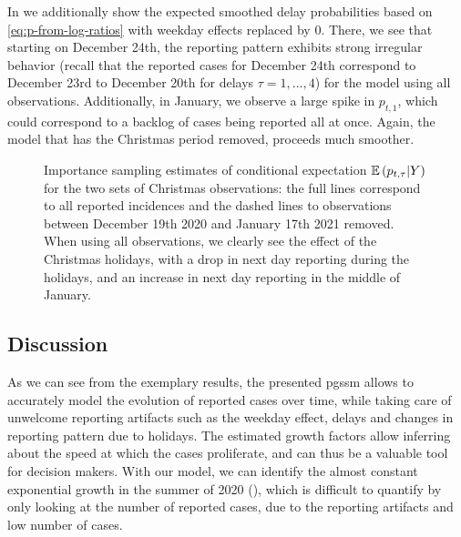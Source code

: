 In  we additionally show the expected smoothed delay probabilities based on \eqref{eq:p-from-log-ratios} with weekday effects replaced by $0$. There, we see that starting on December 24th, the reporting pattern exhibits strong irregular behavior (recall that the reported cases for December 24th correspond to December 23rd to December 20th for delays $\tau =1, \dots, 4$) for the model using all observations. Additionally, in January, we observe a large spike in $p_{t,1}$, which could correspond to a backlog of cases being reported all at once. Again, the model that has the Christmas period removed, proceeds much smoother.

\begin{figure}
    \resizebox{\textwidth}{!}{%
    }
    \caption{Importance sampling estimates of conditional expectation $\mathbb E \left( p_{t, \tau} | Y \right)$ for the two sets of Christmas observations: the full lines correspond to all reported incidences and the dashed lines to observations between December 19th 2020 and January 17th 2021 removed. When using all observations, we clearly see the effect of the Christmas holidays, with a drop in next day reporting during the holidays, and an increase in next day reporting in the middle of January.}
    \label{fig:christmas_delay_probs}
\end{figure}

\subsection{Discussion}
As we can see from the exemplary results, the presented \gls{pgssm} allows to accurately model the evolution of reported cases over time, while taking care of unwelcome reporting artifacts such as the weekday effect, delays and changes in reporting pattern due to holidays. 
The estimated growth factors allow inferring about the speed at which the cases proliferate, and can thus be a valuable tool for decision makers. With our model, we can identify the almost constant exponential growth in the summer of 2020 (), which is difficult to quantify by only looking at the number of reported cases, due to the reporting artifacts and low number of cases. 

